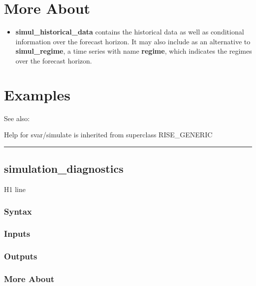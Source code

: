 \documentclass[letterpaper,10pt,english]{sphinxmanual}
\begin{document}
\section{More About}
\label{classes/models/@svar/svar:id113}\begin{itemize}
\item {} 
\textbf{simul\_historical\_data} contains the historical data as well as
conditional information over the forecast horizon. It may also include
as an alternative to \textbf{simul\_regime}, a time series with name
\textbf{regime}, which indicates the regimes over the forecast horizon.

\end{itemize}


\section{Examples}
\label{classes/models/@svar/svar:id114}
See also:

Help for svar/simulate is inherited from superclass RISE\_GENERIC


\bigskip\hrule{}\bigskip



\subsection{simulation\_diagnostics}
\label{classes/models/@svar/svar:simulation-diagnostics}\label{classes/models/@svar/svar:id115}
H1 line


\subsubsection{Syntax}
\label{classes/models/@svar/svar:id116}

\subsubsection{Inputs}
\label{classes/models/@svar/svar:id117}

\subsubsection{Outputs}
\label{classes/models/@svar/svar:id118}

\subsubsection{More About}
\label{classes/models/@svar/svar:id119}
\end{document}
